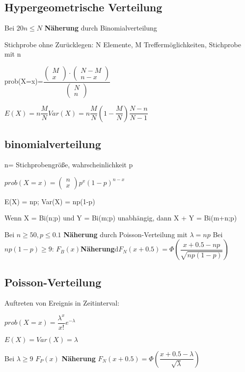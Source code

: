 \subsection*{Hypergeometrische Verteilung}
Bei $ 20 n \leq N $ \textbf{Näherung} durch Binomialverteilung

Stichprobe ohne Zurücklegen: N Elemente, M Treffermöglichkeiten, Stichprobe mit n

prob(X=x)=$ \dfrac{\left( \! \begin{array}{c}M \\ x \end{array} \! \right) \cdot \left( \begin{array}{c}N-M \\ n-x \end{array}  \right) }{\left( \begin{array}{c}N \\ n \end{array}  \right) }$

$E(X)=n\dfrac{M}{N}
Var(X) = n\dfrac{M}{N} \left( 1- \dfrac{M}{N} \right) \dfrac{N-n}{N-1}
$

\subsection*{binomialverteilung}
n= Stichprobengröße, wahrscheinlichkeit p 

$prob(X=x) = \left( \begin{array}{c} n \\ x \end{array} \right) p^x (1-p)^{n-x}$

E(X) = np; Var(X) = np(1-p)

Wenn X = Bi(n;p) und Y = Bi(m;p) unabhängig, dann X + Y = Bi(m+n;p)

Bei $n \geq 50, p \leq 0.1 $ \textbf{Näherung} durch Poisson-Verteilung mit $\lambda = np$
Bei $np(1-p)\geq 9$: $F_B(x) $\textbf{Näherung}d$ F_N(x+0.5) = \Phi \left( \dfrac{x+0.5 -np}{\sqrt{np(1-p)}}\right)$


\subsection*{Poisson-Verteilung}
Auftreten von Ereignis in Zeitinterval:

$prob(X=x) = \dfrac{\lambda^x}{x!}e^{-\lambda}$

$E(X) = Var(X) = \lambda$

Bei $\lambda \geq 9$ $F_P(x) $ \textbf{Näherung} $ F_N(x+0.5)=\Phi \left( \dfrac{x+0.5-\lambda}{\sqrt{\lambda}}\right)$


